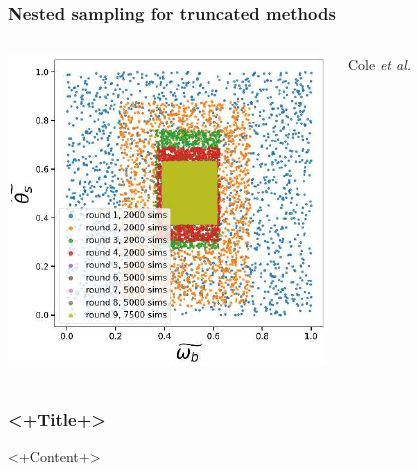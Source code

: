 \documentclass[aspectratio=169]{beamer}
\begin{document}
\begin{frame}
    \frametitle{Nested sampling for truncated methods}

    \begin{columns}
        \includegraphics[width=\textwidth]{figures/tmnre}

        \hfill Cole \textit{et al.}~
    \end{columns}
    
\end{frame}


\begin{frame}
    \frametitle{<+Title+>}
    <+Content+>
\end{frame}


\appendix
\end{document}
